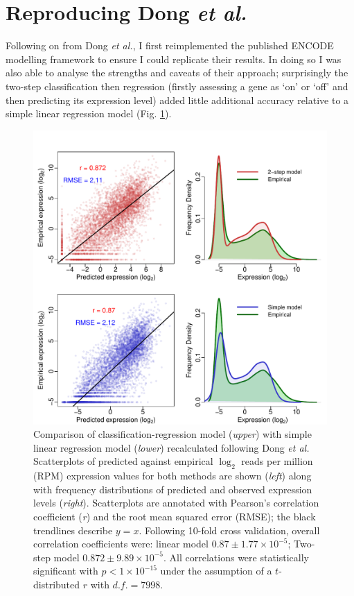 \documentclass[a4paper,11pt,oneside]{book}
\begin{document}
\section{Reproducing Dong \emph{et al.} }

Following on from Dong \emph{et al.},\cite{Dong2012} I first
reimplemented the published ENCODE modelling framework to ensure I could
replicate their results. In doing so I was also able to analyse the
strengths and caveats of their approach; surprisingly the two-step classification
then regression (firstly assessing a gene as `on' or `off' and then
predicting its expression level) added little additional accuracy relative to a simple
linear regression model 
(Fig. \ref{fig:TwoStepvsSimple}). 

\begin{figure}
\begin{center}
\includegraphics[width=.7\textwidth]{figs/improvedDongPlot.pdf}
\captionsetup{width=\textwidth}
\caption{Comparison of classification-regression model (\emph{upper})
  with simple linear regression model (\emph{lower}) recalculated following Dong
  \emph{et al.}\cite{Dong2012} Scatterplots of predicted against empirical
  $\log_2$ reads per million (RPM) expression values for both methods are shown (\emph{left})
  along with frequency distributions of predicted and observed
  expression levels (\emph{right}). Scatterplots are annotated with
  Pearson's correlation coefficient (\emph{r}) and the root mean
  squared error (RMSE); the black trendlines describe $y =
  x$. Following 10-fold cross validation, overall correlation
  coefficients were: linear model $0.87 \pm 1.77 \times 10^{-5} $;
  Two-step model $0.872 \pm 9.89 \times 10^{-5} $. All correlations
  were statistically significant with $p < 1 \times 10^{-15}$ under the assumption of a
  $t$-distributed $r$ with $d.f. = 7998$.
}\label{fig:TwoStepvsSimple}
\end{center}
\end{figure} 
\end{document}
